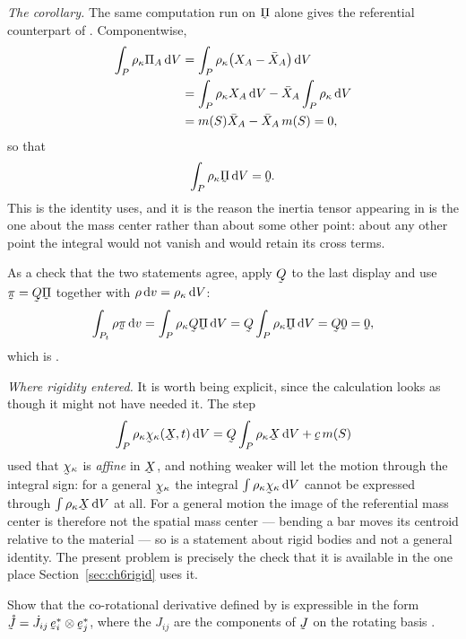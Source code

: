 \begin{solution}
\medskip
\noindent\emph{The corollary.}
The same computation run on $\vek\Pi$ alone gives the referential
counterpart of . Componentwise,
\[
\begin{aligned}
   \int_{P}\rho_{\kappa}\Pi_{A}\,\mathrm{d} V
   &=\int_{P}\rho_{\kappa}\big(X_{A}-\bar X_{A}\big)\,\mathrm{d} V\\
   &=\int_{P}\rho_{\kappa}X_{A}\,\mathrm{d} V
    -\bar X_{A}\int_{P}\rho_{\kappa}\,\mathrm{d} V\\
   &=m(S)\bar X_{A}-\bar X_{A}\,m(S)=0 ,
\end{aligned}
\]
so that
\[
   \int_{P}\rho_{\kappa}\vek\Pi\,\dl V=\bze .
\]
This is the identity  uses, and it is the reason the inertia
tensor appearing in  is the one about the mass center rather
than about some other point: about any other point the integral would
not vanish and  would retain its cross terms.

As a check that the two statements agree, apply $\bQ$ to the last
display and use $\vek\pi=\bQ\vek\Pi$ together with
$\rho\,\mathrm{d} v=\rho_{\kappa}\,\mathrm{d} V$:
\[
   \int_{P_{t}}\rho\vek\pi\,\dl v
   =\int_{P}\rho_{\kappa}\bQ\vek\Pi\,\dl V
   =\bQ\int_{P}\rho_{\kappa}\vek\Pi\,\dl V=\bQ\bze=\bze ,
\]
which is .

\medskip
\noindent\emph{Where rigidity entered.}
It is worth being explicit, since the calculation looks as though it
might not have needed it. The step
\[
   \int_{P}\rho_{\kappa}\bchi_{\kappa}(\bX,t)\,\dl V
   =\bQ\int_{P}\rho_{\kappa}\bX\,\dl V+\bc\,m(S)
\]
used that $\bchi_{\kappa}$ is \emph{affine} in $\bX$, and nothing
weaker will let the motion through the integral sign: for a general
$\bchi_{\kappa}$ the integral $\int\rho_{\kappa}\bchi_{\kappa}\,\dl V$
cannot be expressed through $\int\rho_{\kappa}\bX\,\dl V$ at all. For a
general motion the image of the referential mass center is therefore not
the spatial mass center --- bending a bar moves its centroid relative
to the material --- so  is a statement about rigid bodies and
not a general identity. The present problem is precisely the check that
it is available in the one place Section~\ref{sec:ch6rigid} uses it.
\end{solution}

\begin{problem}
Show that the co-rotational derivative defined by  is
expressible in the form
$\mathring{\vek{J}}=\dot J_{ij}\,\be^{*}_{i}\otimes\be^{*}_{j}$,
where the $J_{ij}$ are the components of $\vek{J}$ on the rotating
basis .
\end{problem}

